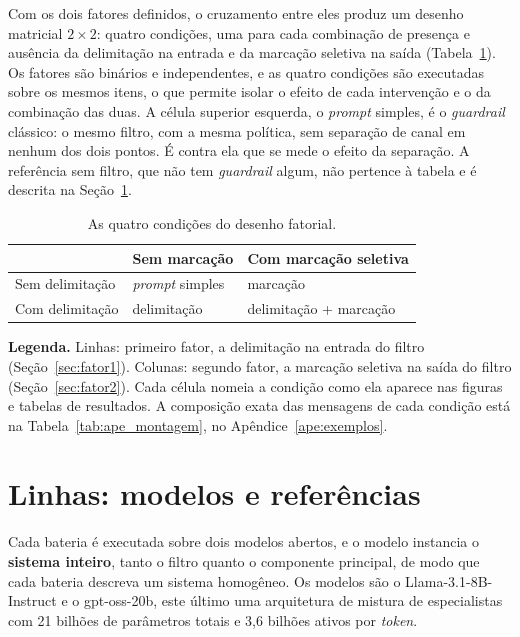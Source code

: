 Com os dois fatores definidos, o cruzamento entre eles produz um desenho
matricial $2 \times 2$: quatro condições, uma para cada combinação de presença e
ausência da delimitação na entrada e da marcação seletiva na saída
(Tabela~\ref{tab:condicoes}). Os fatores são binários e independentes, e as
quatro condições são executadas sobre os mesmos itens, o que permite isolar o
efeito de cada intervenção e o da combinação das duas. A célula superior
esquerda, o \textit{prompt} simples, é o \textit{guardrail} clássico: o mesmo
filtro, com a mesma política, sem separação de canal em nenhum dos dois pontos.
É contra ela que se mede o efeito da separação. A referência sem filtro, que
não tem \textit{guardrail} algum, não pertence à tabela e é descrita na
Seção~\ref{sec:linhas}.

\begin{table}[H]
\centering
\caption{As quatro condições do desenho fatorial.}
\label{tab:condicoes}
\begin{tabular}{lll}
\toprule
 & Sem marcação & Com marcação seletiva \\
\midrule
Sem delimitação & \textit{prompt} simples & marcação \\
Com delimitação & delimitação & delimitação + marcação \\
\bottomrule
\end{tabular}
\vspace{2pt}
\begin{minipage}{\textwidth}
\footnotesize\raggedright
\textbf{Legenda.} Linhas: primeiro fator, a delimitação na entrada do filtro
(Seção~\ref{sec:fator1}). Colunas: segundo fator, a marcação seletiva na saída
do filtro (Seção~\ref{sec:fator2}). Cada célula nomeia a condição como ela
aparece nas figuras e tabelas de resultados. A composição exata das mensagens
de cada condição está na Tabela~\ref{tab:ape_montagem}, no
Apêndice~\ref{ape:exemplos}.
\end{minipage}
\end{table}

\section{Linhas: modelos e referências}\label{sec:linhas}

Cada bateria é executada sobre dois modelos abertos, e o modelo instancia o
\textbf{sistema inteiro}, tanto o filtro quanto o componente principal, de
modo que cada bateria descreva um sistema homogêneo. Os modelos são o
Llama-3.1-8B-Instruct e o gpt-oss-20b, este último uma arquitetura de mistura de especialistas com 21
bilhões de parâmetros totais e 3,6 bilhões ativos por \textit{token}.

